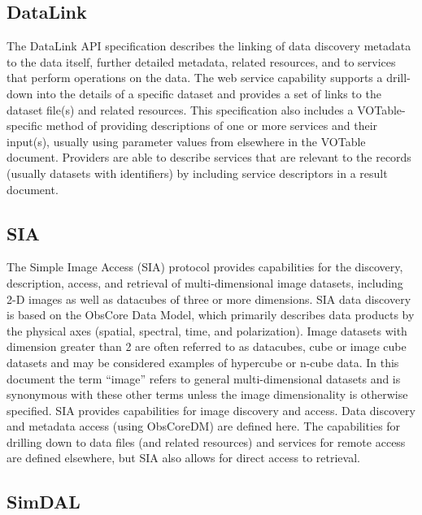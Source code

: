 \documentclass[11pt,letter]{ivoa}
\begin{document}
\subsection{DataLink}

The DataLink \citep{2023ivoa.spec.1215B} API specification describes the
linking of data discovery metadata to
the data itself, further detailed metadata, related resources, and to
services that perform
operations on the data. The web service capability supports a drill-down
into the details
of a specific dataset and provides a set of links to the dataset file(s)
and related resources.
This specification also includes a VOTable-specific method of providing
descriptions of one
or more services and their input(s), usually using parameter values from
elsewhere in the
VOTable document. Providers are able to describe services that are
relevant to the records
(usually datasets with identifiers) by including service descriptors in
a result document.

\subsection{SIA}

The Simple Image Access (SIA) \citep{2015ivoa.spec.1223D} protocol
provides capabilities for the discovery, description,
access, and retrieval of multi-dimensional image datasets, including 2-D
images as well
as datacubes of three or more dimensions. SIA data discovery is based on
the ObsCore Data
Model, which primarily describes data products by the physical axes
(spatial, spectral,
time, and polarization). Image datasets with dimension greater than 2
are often referred
to as datacubes, cube or image cube datasets and may be considered
examples of hypercube
or n-cube data. In this document the term ``image'' refers to general
multi-dimensional
datasets and is synonymous with these other terms unless the image
dimensionality is
otherwise specified. SIA provides capabilities for image discovery and
access. Data
discovery and metadata access (using ObsCoreDM) are defined here. The
capabilities for
drilling down to data files (and related resources) and services for
remote access are
defined elsewhere, but SIA also allows for direct access to retrieval. 

\subsection{SimDAL}
\end{document}
